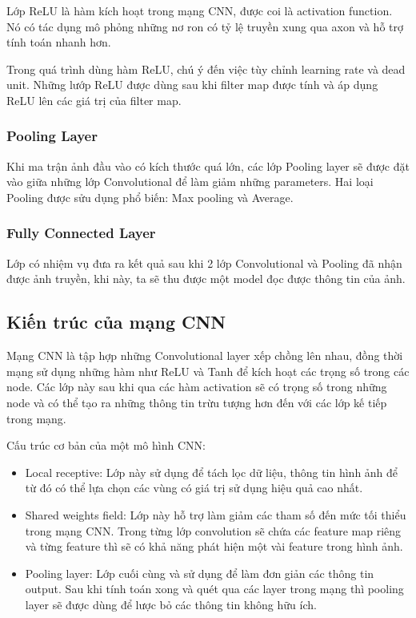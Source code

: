 Lớp ReLU là hàm kích hoạt trong mạng CNN, được coi là activation function. Nó có tác dụng mô phỏng những nơ ron có tỷ lệ truyền xung qua axon và hỗ trợ tính toán nhanh hơn.

Trong quá trình dùng hàm ReLU, chú ý đến việc tùy chỉnh learning rate và dead unit. Những lướp ReLU được dùng sau khi filter map được tính và áp dụng ReLU lên các giá trị của filter map.

\subsubsection{Pooling Layer}

Khi ma trận ảnh đầu vào có kích thước quá lớn, các lớp Pooling layer sẽ được đặt vào giữa những lớp Convolutional để làm giảm những parameters. Hai loại Pooling được sửu dụng phổ biến: Max pooling và Average.

\subsubsection{Fully Connected Layer}

Lớp có nhiệm vụ đưa ra kết quả sau khi 2 lớp Convolutional và Pooling đã nhận được ảnh truyền, khi này, ta sẽ thu được một model đọc được thông tin của ảnh.

\subsection{Kiến trúc của mạng CNN}

Mạng CNN là tập hợp những Convolutional layer xếp chồng lên nhau, đồng thời mạng sử dụng những hàm như ReLU và Tanh để kích hoạt các trọng số trong các node. Các lớp này sau khi qua các hàm activation sẽ có trọng số trong những node và có thể tạo ra những thông tin trừu tượng hơn đến với các lớp kế tiếp trong mạng.  

Cấu trúc cơ bản của một mô hình CNN:

\begin{itemize}
	\item Local receptive: Lớp này sử dụng để tách lọc dữ liệu, thông tin hình ảnh để từ đó có thể lựa chọn các vùng có giá trị sử dụng hiệu quả cao nhất.
	
	\item Shared weights field: Lớp này hỗ trợ làm giảm các tham số đến mức tối thiểu trong mạng CNN. Trong từng lớp convolution sẽ chứa các feature map riêng và từng feature thì sẽ có khả năng phát hiện một vài feature trong hình ảnh.
	
	\item Pooling layer: Lớp cuối cùng và sử dụng để làm đơn giản các thông tin output. Sau khi tính toán xong và quét qua các layer trong mạng thì pooling layer sẽ được dùng để lược bỏ các thông tin không hữu ích.
\end{itemize}
